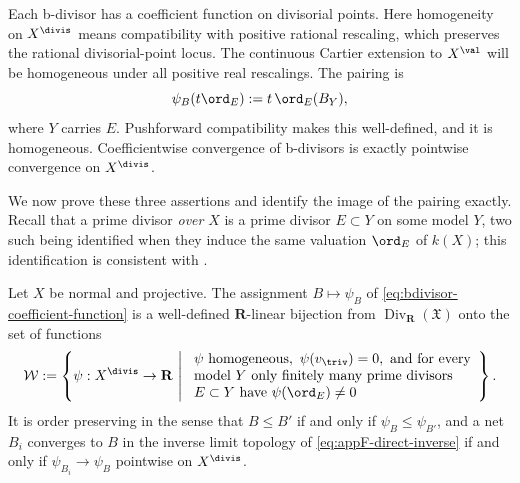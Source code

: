 Each b-divisor has a coefficient function on divisorial points.
Here homogeneity on $X^{\divis}$ means compatibility with positive
rational rescaling, which preserves the rational divisorial-point locus.
The continuous Cartier extension to $X^{\val}$ will be homogeneous under
all positive real rescalings. The pairing is
\begin{equation}
\label{eq:bdivisor-coefficient-function}
                  \psi_B(t\ord_E):=t\,\ord_E(B_Y),
\end{equation}
where $Y$ carries $E$.  Pushforward compatibility makes this
well-defined, and it is homogeneous.  Coefficientwise convergence of
b-divisors is exactly pointwise convergence on $X^{\divis}$.

We now prove these three assertions and identify the image of the pairing
exactly.  Recall that a prime divisor \emph{over} $X$ is a prime divisor
$E\subset Y$ on some model $Y$, two such being identified when they
induce the same valuation $\ord_E$ of $k(X)$; this identification is
consistent with .

\begin{proposition}
\label{prop:ch35-weil-coefficient-bijection}
Let $X$ be normal and projective.  The assignment
$B\mapsto\psi_B$ of \eqref{eq:bdivisor-coefficient-function} is a
well-defined $\mathbf R$-linear bijection from
$\operatorname{Div}_{\mathbf R}(\mathfrak X)$ onto the set of functions
\begin{equation}
\label{eq:ch35-locally-finite-homogeneous}
 \mathcal W:=\left\{\psi:X^{\divis}\to\mathbf R
 \ \middle|\
 \begin{array}{l}
 \psi\ \text{homogeneous},\ \psi(v_{\triv})=0,\ \text{and for every}\\
 \text{model }Y\ \text{only finitely many prime divisors}\\
 E\subset Y\ \text{have}\ \psi(\ord_E)\neq0
 \end{array}
 \right\}.
\end{equation}
It is order preserving in the sense that $B\leq B'$ if and only if
$\psi_B\leq\psi_{B'}$, and a net $B_i$ converges to $B$ in the inverse
limit topology of \eqref{eq:appF-direct-inverse} if and only if
$\psi_{B_i}\to\psi_B$ pointwise on $X^{\divis}$.
\end{proposition}

